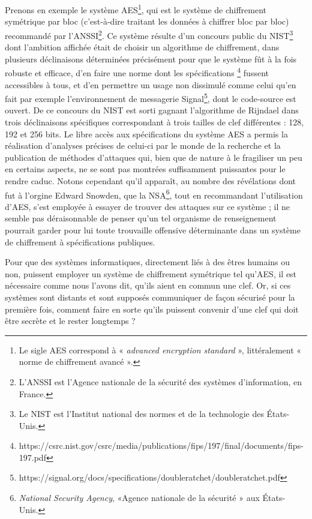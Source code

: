 Prenons en exemple le système AES\footnote{Le sigle AES correspond à « {\it advanced encryption
standard} », littéralement « norme de chiffrement avancé ».}, qui est le système de chiffrement
symétrique par bloc (c’est-à-dire traitant les données à chiffrer bloc par bloc) recommandé par
l’ANSSI\footnote{L’ANSSI est l’Agence nationale de la sécurité des systèmes d’information, en
France.}.
Ce système résulte d’un concours public du NIST\footnote{Le NIST est l’Institut national des normes
et de la technologie des États-Unis.} dont l’ambition affichée était de choisir un algorithme de
chiffrement, dans plusieurs déclinaisons déterminées précisément pour que le système fût à la fois
robuste et efficace, d’en faire une norme dont les spécifications%
\footnote{https://csrc.nist.gov/csrc/media/publications/fips/197/final/documents/fips-197.pdf}
fussent accessibles à tous, et d’en permettre un usage non dissimulé comme celui qu’en fait par
exemple l’environnement de messagerie
Signal\footnote{https://signal.org/docs/specifications/doubleratchet/doubleratchet.pdf}, dont le
code-source est ouvert.
De ce concours du NIST est sorti gagnant l’algorithme de Rijndael dans trois déclinaisons
spécifiques correspondant à trois tailles de clef différentes : 128, 192 et 256 bits. 
Le libre accès aux spécifications du système AES a permis la réalisation d’analyses précises de
celui-ci par le monde de la recherche et la publication de méthodes d’attaques qui, bien que de
nature à le fragiliser un peu en certains aspects, ne se sont pas montrées suffisamment
puissantes pour le rendre caduc.
Notons cependant qu’il apparaît, au nombre des révélations dont fut à l’orgine Edward Snowden, que
la NSA\footnote{{\it National Security Agency}, «Agence nationale de la sécurité » aux États-Unis.},
tout en recommandant l’utilisation d’AES, s’est employée à essayer de trouver des attaques sur ce
système ; il ne semble pas déraisonnable de penser qu’un tel organisme de renseignement pourrait
garder pour lui toute trouvaille offensive déterminante dans un système de chiffrement à
spécifications publiques.

Pour que des systèmes informatiques, directement liés à des êtres humains ou non, puissent
employer un système de chiffrement symétrique tel qu’AES, il est nécessaire comme nous l’avons dit,
qu’ils aient en commun une clef.
Or, si ces systèmes sont distants et sont supposés communiquer de façon sécurisé pour la première
fois, comment faire en sorte qu’ils puissent convenir d’une clef qui doit être secrète et le rester
longtemps ?

